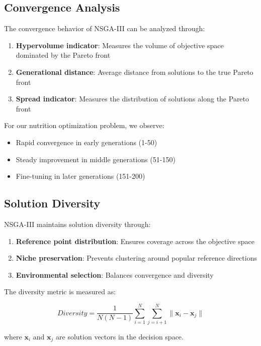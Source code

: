 \subsection{Convergence Analysis}

The convergence behavior of NSGA-III can be analyzed through:

\begin{enumerate}
    \item \textbf{Hypervolume indicator}: Measures the volume of objective space dominated by the Pareto front
    \item \textbf{Generational distance}: Average distance from solutions to the true Pareto front
    \item \textbf{Spread indicator}: Measures the distribution of solutions along the Pareto front
\end{enumerate}

For our nutrition optimization problem, we observe:

\begin{itemize}
    \item Rapid convergence in early generations (1-50)
    \item Steady improvement in middle generations (51-150)
    \item Fine-tuning in later generations (151-200)
\end{itemize}

\subsection{Solution Diversity}

NSGA-III maintains solution diversity through:

\begin{enumerate}
    \item \textbf{Reference point distribution}: Ensures coverage across the objective space
    \item \textbf{Niche preservation}: Prevents clustering around popular reference directions
    \item \textbf{Environmental selection}: Balances convergence and diversity
\end{enumerate}

The diversity metric is measured as:

\begin{equation}
Diversity = \frac{1}{N(N-1)} \sum_{i=1}^{N} \sum_{j=i+1}^{N} \|\mathbf{x}_i - \mathbf{x}_j\|
\end{equation}

where $\mathbf{x}_i$ and $\mathbf{x}_j$ are solution vectors in the decision space. 